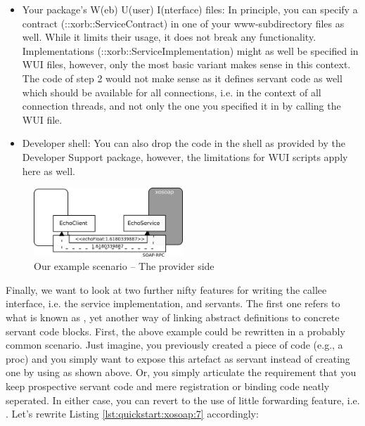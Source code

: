\begin{enumerate}
\begin{itemize}
\item Your package's W(eb) U(user) I(nterface) files: In principle, you can specify a contract (::xorb::ServiceContract) in one of your www-subdirectory files as well. While it limits their usage, it does not break any functionality. Implementations (::xorb::ServiceImplementation) might as well be specified in WUI files, however, only the most basic variant makes sense in this context. The code of step 2 would not make sense as it defines servant code as well which should be available for all connections, i.e. in the context of all connection threads, and not only the one you specified it in by calling the WUI file.
\item Developer shell: You can also drop the code in the shell as provided by the Developer Support package, however, the limitations for WUI scripts apply here as well.
\end{itemize}

\end{enumerate}
  \begin{figure}[htbp]
\begin{center}
\includegraphics[width=0.5\textwidth]{img/provider.png}
\caption{Our example scenario -- The provider side}
\label{fig:quickstart:xosoap:2}
\end{center}
\end{figure}

Finally, we want to look at two further nifty features for writing the callee interface, i.e. the service implementation, and servants. The first one refers to what is known as , yet another way of linking abstract definitions to concrete servant code blocks. First, the above example could be rewritten in a probably common scenario. Just imagine, you previously created a piece of code (e.g., a proc) and you simply want to expose this artefact as servant instead of creating one by using  as shown above.
Or, you simply articulate the requirement that you keep prospective servant code and mere registration or binding code neatly seperated. In either case, you can revert to the use of little forwarding feature, i.e. . Let's rewrite Listing \ref{lst:quickstart:xosoap:7} accordingly:

